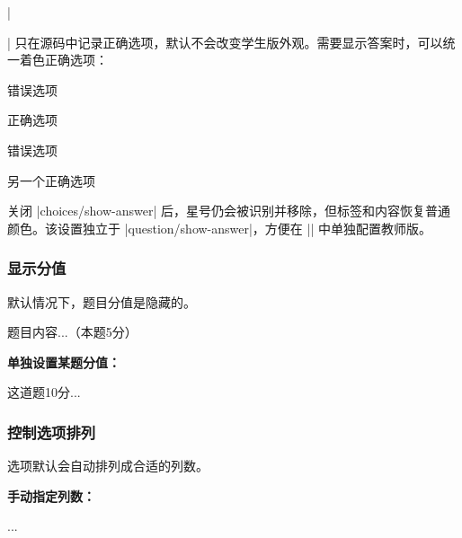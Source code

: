 |\item*| 只在源码中记录正确选项，默认不会改变学生版外观。需要显示答案时，可以统一着色正确选项：

\begin{latexcode}

  \begin{choices}
    \item 错误选项
    \item* 正确选项
    \item 错误选项
    \item* 另一个正确选项
  \end{choices}
\end{latexcode}

关闭 |choices/show-answer| 后，星号仍会被识别并移除，但标签和内容恢复普通颜色。该设置独立于 |question/show-answer|，方便在 |\ExamPrintAnswerSet| 中单独配置教师版。

\subsubsection{显示分值}

默认情况下，题目分值是隐藏的。

\begin{latexcode}

  \begin{question}[points = 5]
    题目内容...（本题5分）
  \end{question}
\end{latexcode}

\textbf{单独设置某题分值：}

\begin{latexcode}
  \begin{question}[points = 10]
    这道题10分...
  \end{question}
\end{latexcode}

\subsubsection{控制选项排列}

选项默认会自动排列成合适的列数。

\textbf{手动指定列数：}

\begin{latexcode}

  \begin{choices}[columns = 4]  %
    \item ...
  \end{choices}
\end{latexcode}

